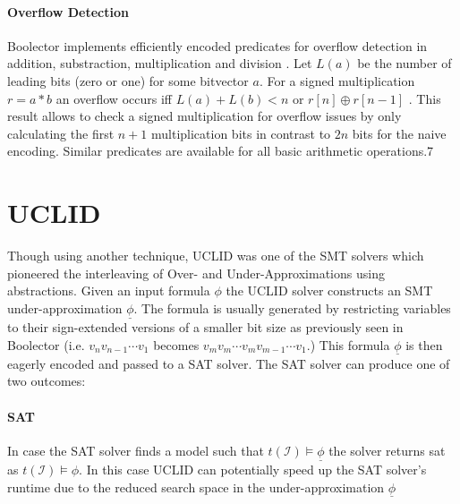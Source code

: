 \paragraph{Overflow Detection}
Boolector implements efficiently encoded predicates for overflow detection in addition, substraction, multiplication and division \cite{Brummayer-PhD}. Let $L\left(a\right)$ be the number of leading bits (zero or one) for some bitvector $a$. For a signed multiplication $r=a*b$ an overflow occurs iff $L\left(a\right) + L\left(b\right) < n$ or $r\left[n\right] \oplus r\left[n-1\right]$ \cite{schulteGokMulOv}. This result allows to check a signed multiplication for overflow issues by only calculating the first $n+1$ multiplication bits in contrast to $2n$ bits for the naive encoding. Similar predicates are available for all basic arithmetic operations.7

\section{UCLID}
Though using another technique, \textsc{UCLID} \cite{Bryant2007_Chapter_DecidingBit-VectorArithmeticWi.pdf} was one of the SMT solvers which pioneered the interleaving of Over- and Under-Approximations using abstractions. Given an input formula $\phi$ the \textsc{UCLID} solver constructs an SMT under-approximation $\underline{\phi}$. The formula is usually generated by restricting variables to their sign-extended versions of a smaller bit size as previously seen in Boolector (i.e. $v_nv_{n-1}\dotsi v_1$ becomes $v_mv_m\dotsi v_m v_{m-1}\dotsi v_1$.) This formula $\underline{\phi}$ is then eagerly encoded and passed to a SAT solver. The SAT solver can produce one of two outcomes:

\paragraph{SAT} In case the SAT solver finds a model such that $t\left(\mathcal{I}\right)\vDash\underline{\phi}$ the solver returns sat as $t\left(\mathcal{I}\right)\vDash\phi$. In this case \textsc{UCLID} can potentially speed up the SAT solver's runtime due to the reduced search space in the under-approximation $\underline{\phi}$

